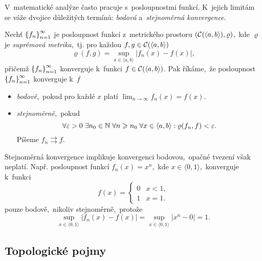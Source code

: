 V~matematické analýze často pracuje s~posloupnostmi funkcí. K~jejich limitám se váže dvojice důležitých termínů: \emph{bodová} a~\emph{stejnoměrná konvergence}.
\begin{definition}\label{def:bodova-stejnomerna-konvergence}
    Nechť $\left\{f_n\right\}_{n=1}^\infty$ je posloupnost funkcí z~metrického prostoru $(\mathcal{C}(\langle a,b\rangle),\varrho)$,~kde $\varrho$ je \emph{suprémová metrika},~tj. pro každou $f,g\in \mathcal{C}(\langle a,b\rangle)$
    \[\varrho(f,g)=\sup_{x\in\langle a,b\rangle}|f_n(x)-f(x)|,\]
    přičemž $\left\{f_n\right\}_{n=1}^\infty$ konverguje k~funkci $f\in \mathcal{C}(\langle a,b\rangle)$.
    Pak říkáme,~že posloupnost $\left\{f_n\right\}_{n=1}^\infty$ konverguje k~$f$
    \begin{itemize}
        \item \emph{bodově},~pokud pro každé $x$ platí $\lim_{n\to\infty}f_n(x)=f(x)$.
        \item \emph{stejnoměrně},~pokud
        \[\forall\varepsilon>0\;\exists n_0\in\mathbb{N}\;\forall n\geqslant n_0\;\forall x\in\langle a,b\rangle: \varrho(f_n,f)<\varepsilon.\]
        Píšeme $f_n\rightrightarrows f$.
    \end{itemize}
\end{definition}
Stejnoměrná konvergence implikuje konvergenci bodovou,~opačné tvezení však neplatí. Např. posloupnost funkcí $f_n(x)=x^n$,~kde $x\in\langle 0,1\rangle$,~konverguje k~funkci 
\[f(x)=\begin{cases}
    0 & x < 1,\\
    1 & x = 1.
\end{cases}\]
pouze bodově,~nikoliv stejnoměrně,~protože
\[\sup_{x\in\langle 0,1\rangle}|f_n(x)-f(x)|=\sup_{x\in\langle 0,1\rangle}|x^n-0|=1.\]

\subsection{Topologické pojmy}\label{subsec:topologicke-pojmy}

